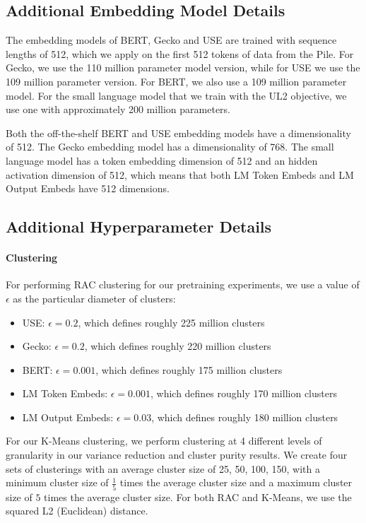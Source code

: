 \subsection{Additional Embedding Model Details}

The embedding models of BERT, Gecko and USE are trained with sequence lengths of 512, which we apply on the first 512 tokens of data from the Pile. 
For Gecko, we use the 110 million parameter model version, while for USE we use the 109 million parameter version. 
For BERT, we also use a 109 million parameter model. 
For the small language model that we train with the UL2 objective, we use one with approximately 200 million parameters. 

Both the off-the-shelf BERT and USE embedding models have a dimensionality of 512. The Gecko embedding model has a dimensionality of 768.
The small language model has a token embedding dimension of 512 and an hidden activation dimension of 512, which means that both LM Token Embeds and LM Output Embeds have 512 dimensions.

\subsection{Additional Hyperparameter Details}\label{appx:hyperparam_details}

\paragraph{Clustering}

For performing RAC clustering for our pretraining experiments, we use a value of $\epsilon$ as the particular diameter of clusters:
\begin{itemize}
    \item USE: $\epsilon = 0.2$, which defines roughly 225 million clusters
    \item Gecko: $\epsilon = 0.2$, which defines roughly 220 million clusters
    \item BERT: $\epsilon = 0.001$, which defines roughly 175 million clusters
    \item LM Token Embeds: $\epsilon = 0.001$, which defines roughly 170 million clusters
    \item LM Output Embeds: $\epsilon = 0.03$, which defines roughly 180 million clusters
\end{itemize}

For our K-Means clustering, we perform clustering at 4 different levels of granularity in our variance reduction and cluster purity results. We create four sets of clusterings with an average cluster size of 25, 50, 100, 150, with a minimum cluster size of $\frac{1}{5}$ times the average cluster size and a maximum cluster size of $5$ times the average cluster size. 
For both RAC and K-Means, we use the squared L2 (Euclidean) distance.

